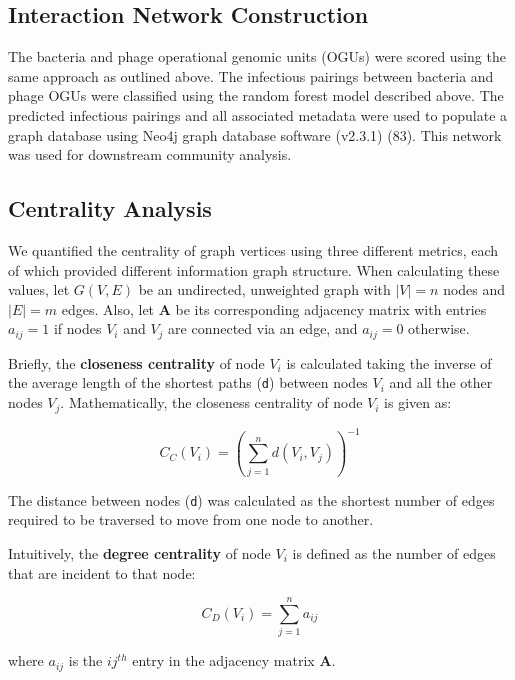 \documentclass[12pt,]{article}
\begin{document}
\subsection{Interaction Network
Construction}\label{interaction-network-construction}

The bacteria and phage operational genomic units (OGUs) were scored
using the same approach as outlined above. The infectious pairings
between bacteria and phage OGUs were classified using the random forest
model described above. The predicted infectious pairings and all
associated metadata were used to populate a graph database using Neo4j
graph database software (v2.3.1) (83). This network was used for
downstream community analysis.

\subsection{Centrality Analysis}\label{centrality-analysis}

We quantified the centrality of graph vertices using three different
metrics, each of which provided different information graph structure.
When calculating these values, let \(G(V,E)\) be an undirected,
unweighted graph with \(|V|=n\) nodes and \(|E|=m\) edges. Also, let
\(\mathbf{A}\) be its corresponding adjacency matrix with entries
\(a_{ij} = 1\) if nodes \(V_i\) and \(V_j\) are connected via an edge,
and \(a_{ij} = 0\) otherwise.

Briefly, the \textbf{closeness centrality} of node \(V_i\) is calculated
taking the inverse of the average length of the shortest paths
(\texttt{d}) between nodes \(V_i\) and all the other nodes \(V_j\).
Mathematically, the closeness centrality of node \(V_i\) is given as:

\[ { C }_{ C }\left( { V }_{ i } \right) ={ \left( \sum _{ j=1 }^{ n }{ d\left( { V }_{ i },{ V }_{ j } \right)  }  \right)  }^{ -1 } \]

The distance between nodes (\texttt{d}) was calculated as the shortest
number of edges required to be traversed to move from one node to
another.

Intuitively, the \textbf{degree centrality} of node \(V_i\) is defined
as the number of edges that are incident to that node:

\[ { C }_{ D }\left( { V }_{ i } \right) =\sum _{ j=1 }^{ n }{ { a }_{ ij } } \]

where \(a_{ij}\) is the \(ij^{th}\) entry in the adjacency matrix
\(\mathbf{A}\).
\end{document}
